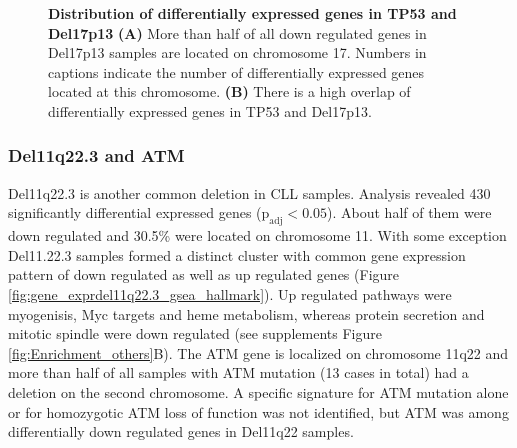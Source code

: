 \begin{figure}
\begin{subfigure}[t]{0.6\columnwidth}
		\subcaption*{}
		\label{fig:vennDel17TP53}
	\end{subfigure}
	\caption{\textbf{Distribution of differentially expressed genes in TP53 and Del17p13} \textbf{(A)} More than half of all down regulated genes in Del17p13 samples are located on chromosome 17. Numbers in captions indicate the number of differentially expressed genes located at this chromosome. \textbf{(B)} There is a high overlap of differentially expressed genes in TP53 and Del17p13.}
	\label{fig:GeneDist17}
\end{figure}


\FloatBarrier

\subsubsection{Del11q22.3 and ATM}
Del11q22.3 is another common deletion in CLL samples. Analysis revealed 430 significantly differential expressed genes ($\text{p}_\text{adj} < 0.05$). About half of them were down regulated and 30.5\% were located on chromosome 11. With some exception Del11.22.3 samples formed a distinct cluster with common gene expression pattern of down regulated as well as up regulated genes (Figure \ref{fig:gene_exprdel11q22.3_gsea_hallmark}). Up regulated pathways were myogenisis, Myc targets and heme metabolism, whereas protein secretion and mitotic spindle were down regulated (see supplements Figure \ref{fig:Enrichment_others}B). The ATM gene is localized on chromosome 11q22 and more than half of all samples with ATM mutation (13 cases in total) had a deletion on the second chromosome. A specific signature for ATM mutation alone or for homozygotic ATM loss of function was not identified, but ATM was among differentially down regulated genes in Del11q22 samples.  

\FloatBarrier

